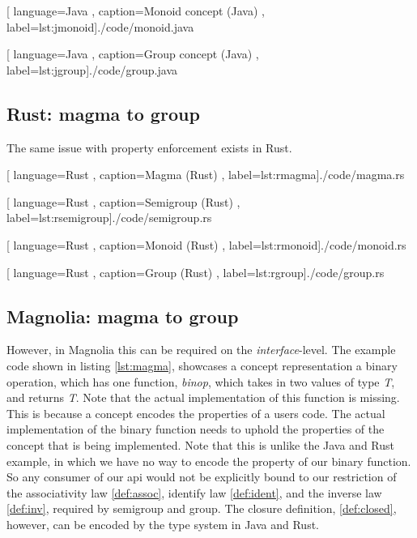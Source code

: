\begin{center}
  
    [ language=Java
    , caption={Monoid concept (Java)}
    , label=lst:jmonoid]{./code/monoid.java}
\end{center}

\begin{center}
  
    [ language=Java
    , caption={Group concept (Java)}
    , label=lst:jgroup]{./code/group.java}
\end{center}

\subsection{Rust: magma to group}

The same issue with property enforcement exists in Rust.

\begin{center}
  
    [ language=Rust
    , caption={Magma (Rust)}
    , label=lst:rmagma]{./code/magma.rs}
\end{center}

\begin{center}
  
    [ language=Rust
    , caption={Semigroup (Rust)}
    , label=lst:rsemigroup]{./code/semigroup.rs}
\end{center}

\begin{center}
  
    [ language=Rust
    , caption={Monoid (Rust)}
    , label=lst:rmonoid]{./code/monoid.rs}
\end{center}

\begin{center}
  
    [ language=Rust
    , caption={Group (Rust)}
    , label=lst:rgroup]{./code/group.rs}
\end{center}

\subsection{Magnolia: magma to group}

However, in Magnolia this can be required on the \textit{interface}-level. The
example code shown in listing \ref{lst:magma}, showcases a concept
representation a binary operation, which has one function, \textit{binop}, which
takes in two values of type \textit{T}, and returns \textit{T}. Note that the
actual implementation of this function is missing. This is because a concept
encodes the properties of a users code. The actual implementation of the
binary function needs to uphold the properties of the concept that is
being implemented. Note that this is unlike the Java and Rust example, in
which we have no way to encode the property of our binary function. So any
consumer of our \gls*{api} would not be explicitly bound to our restriction of
the associativity law \ref{def:assoc}, identify law \ref{def:ident}, and the
inverse law \ref{def:inv}, required by semigroup and group. The closure
definition, \ref{def:closed}, however, can be encoded by the type system in Java
and Rust.

